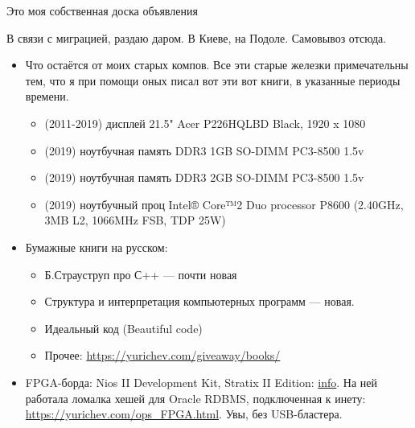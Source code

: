 
\begin{center}
\LARGE{} Это моя собственная доска объявления \normalsize{}
\end{center}

\iffalse
\myhrule{}

В связи с миграцией, раздаю даром. В Киеве, на Подоле. Самовывоз отсюда.

\begin{itemize}
\item Что остаётся от моих старых компов.
Все эти старые железки примечательны тем, что я при помощи оных писал вот эти вот книги, в указанные периоды времени.
\begin{itemize}
\item (2011-2019) дисплей 21.5" Acer P226HQLBD Black, 1920 x 1080
\item (2019) ноутбучная память DDR3 1GB SO-DIMM PC3-8500 1.5v
        \item (2019) ноутбучная память DDR3 2GB SO-DIMM PC3-8500 1.5v
        \item (2019) ноутбучный проц Intel® Core™2 Duo processor P8600 (2.40GHz, 3MB L2, 1066MHz FSB, TDP 25W)
        \end{itemize}

        \item Бумажные книги на русском:
        \begin{itemize}
        \item Б.Страуструп про С++ --- почти новая
        \item Структура и интерпретация компьютерных программ --- новая.
        \item Идеальный код (Beautiful code)
        \item Прочее: \url{https://yurichev.com/giveaway/books/}
        \end{itemize}

        \item FPGA-борда: Nios II Development Kit, Stratix II Edition: \href{https://www.intel.com/content/www/us/en/programmable/products/boards_and_kits/dev-kits/altera/kit-niosii-2s60.html}{info}.
        На ней работала ломалка хешей для Oracle RDBMS, подключенная к инету: \url{https://yurichev.com/ops_FPGA.html}.
        Увы, без USB-бластера.


\end{itemize}
